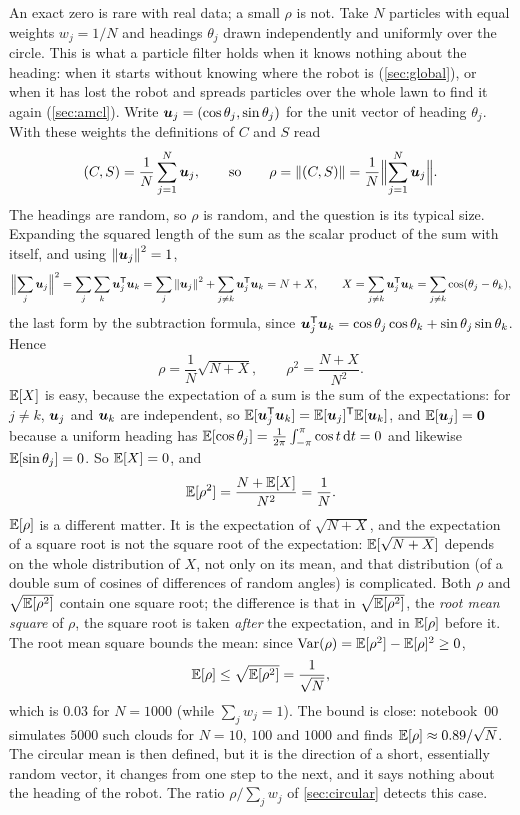 An exact zero is rare with real data; a small $\rho$ is not. Take $N$
particles with equal weights $w_j=1/N$ and headings $\theta_j$ drawn
independently and uniformly over the circle. This is what a particle
filter holds when it knows nothing about the heading: when it starts
without knowing where the robot is (\cref{sec:global}), or when it has
lost the robot and spreads particles over the
whole lawn to find it again (\cref{sec:amcl}). Write $\bm{u}_j=(\cos\theta_j,\sin\theta_j)$ for the
unit vector of heading $\theta_j$. With these weights the definitions of
$C$ and $S$ read
\[
  (C,S)=\frac1N\sum_{j=1}^N\bm{u}_j ,
  \qquad\text{so}\qquad
  \rho=\left\lVert (C,S)\right\rVert=\frac1N\Bigl\|\sum_{j=1}^N\bm{u}_j\Bigr\| .
\]
The headings are random, so $\rho$ is random, and the question is its
typical size. Expanding the squared length of the sum as the scalar
product of the sum with itself, and using $\left\lVert \bm{u}_j\right\rVert^2=1$,
\[
  \Bigl\|\sum_j\bm{u}_j\Bigr\|^2=\sum_j\sum_k\bm{u}_j^{\mathsf{T}}\bm{u}_k
  =\sum_j\left\lVert \bm{u}_j\right\rVert^2+\sum_{j\neq k}\bm{u}_j^{\mathsf{T}}\bm{u}_k
  =N+X,
  \qquad X=\sum_{j\neq k}\bm{u}_j^{\mathsf{T}}\bm{u}_k
  =\sum_{j\neq k}\cos(\theta_j-\theta_k),
\]
the last form by the subtraction formula, since
$\bm{u}_j^{\mathsf{T}}\bm{u}_k=\cos\theta_j\cos\theta_k+\sin\theta_j\sin\theta_k$.
Hence
\[
  \rho=\frac1N\sqrt{N+X},\qquad \rho^2=\frac{N+X}{N^2}.
\]
$\mathbb{E}[X]$ is easy, because the expectation of a sum is the sum of the
expectations: for $j\neq k$, $\bm{u}_j$ and $\bm{u}_k$ are independent,
so $\mathbb{E}[\bm{u}_j^{\mathsf{T}}\bm{u}_k]=\mathbb{E}[\bm{u}_j]^{\mathsf{T}}\mathbb{E}[\bm{u}_k]$, and
$\mathbb{E}[\bm{u}_j]=\bm{0}$ because a uniform heading has
$\mathbb{E}[\cos\theta_j]=\frac1{2\pi}\int_{-\pi}^{\pi}\cos t\,\mathrm dt=0$ and
likewise $\mathbb{E}[\sin\theta_j]=0$. So $\mathbb{E}[X]=0$, and
\[
  \mathbb{E}[\rho^2]=\frac{N+\mathbb{E}[X]}{N^2}=\frac1N .
\]
$\mathbb{E}[\rho]$ is a different matter. It is the expectation of
$\sqrt{N+X}$, and the expectation of a square root is not the square root
of the expectation: $\mathbb{E}[\sqrt{N+X}]$ depends on the whole distribution of
$X$, not only on its mean, and that distribution (of a double sum of
cosines of differences of random angles) is complicated. Both $\rho$ and
$\sqrt{\mathbb{E}[\rho^2]}$ contain one square root; the difference is that in
$\sqrt{\mathbb{E}[\rho^2]}$, the \emph{root mean square} of $\rho$, the square
root is taken \emph{after} the expectation, and in $\mathbb{E}[\rho]$ before it.
The root mean square bounds the mean: since
$\operatorname{Var}(\rho)=\mathbb{E}[\rho^2]-\mathbb{E}[\rho]^2\ge0$,
\[
  \mathbb{E}[\rho]\le\sqrt{\mathbb{E}[\rho^2]}=\frac1{\sqrt N},
\] which is $0.03$ for $N=1000$ (while
$\sum_jw_j=1$). The bound is close: notebook~00 simulates $5000$ such
clouds for $N=10$, $100$ and $1000$ and finds $\mathbb{E}[\rho]\approx0.89/\sqrt
N$. The circular mean is then defined, but it is the
direction of a short, essentially random vector, it changes from one
step to the next, and it says nothing about the heading of the robot.
The ratio $\rho/\sum_jw_j$ of \cref{sec:circular} detects this case.
